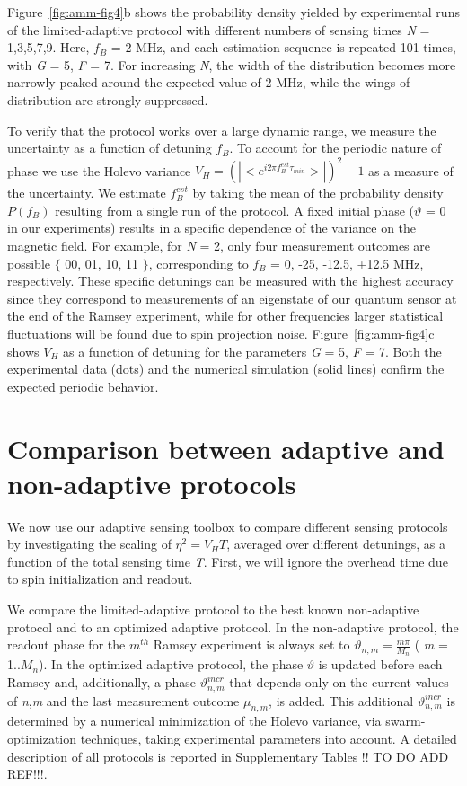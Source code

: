 Figure \,\ref{fig:amm-fig4}b shows the probability density yielded by experimental runs of the limited-adaptive protocol with different numbers of sensing times \textit{N} = 1,3,5,7,9. Here,  $f_B$ = 2 MHz, and each estimation sequence is repeated 101 times, with \textit{G} = 5, \textit{F} = 7. For increasing \textit{N}, the width of the distribution becomes more narrowly peaked around the expected value of 2 MHz, while the wings of distribution are strongly suppressed. 

To verify that the protocol works over a large dynamic range, we measure the uncertainty as a function of detuning $f_B$. To account for the periodic nature of phase we use the Holevo variance $V_H = (|<e^{i2 \pi f_B^{est} \tau_{min}}>|)^2 - 1$ as a measure of the uncertainty. We estimate  $f_B^{est}$ by taking the mean of the probability density $P(f_B)$ resulting from a single run of the protocol. A fixed initial phase ($\vartheta$ = 0 in our experiments) results in a specific dependence of the variance on the magnetic field. For example, for \textit{N} = 2, only four measurement outcomes are possible $\{$ 00, 01, 10, 11 $\}$, corresponding to $f_B$ = 0, -25, -12.5, +12.5 MHz, respectively. These specific detunings can be measured with the highest accuracy since they correspond to measurements of an eigenstate of our quantum sensor at the end of the Ramsey experiment, while for other frequencies larger statistical fluctuations will be found due to spin projection noise. Figure \,\ref{fig:amm-fig4}c shows $V_H$ as a function of detuning for the parameters \textit{G} = 5, \textit{F} = 7. Both the experimental data (dots) and the numerical simulation (solid lines) confirm the expected periodic behavior.

\section{Comparison between adaptive and non-adaptive protocols}
We now use our adaptive sensing toolbox to compare different sensing protocols by investigating the scaling of $\eta^2 = V_H T$, averaged over different detunings, as a function of the total sensing time \textit{T}. First, we will ignore the overhead time due to spin initialization and readout. 

We compare the limited-adaptive protocol to the best known non-adaptive protocol and to an optimized adaptive protocol. In the non-adaptive protocol\cite{Said_Phys.Rev.B_2011,Waldherr_NatNano_2012,Nusran_NatNano_2012}, the readout phase for the $m^{th}$ Ramsey experiment is always set to $\vartheta_{n,m} = \frac{m\pi}{M_n}$  ( \textit{m} = 1..$M_n$). In the optimized adaptive protocol\cite{Hentschel_Phys.Rev.Lett._2010,Hayes_Phys.Rev.A_2014}, the phase $\vartheta$ is updated before each Ramsey and, additionally, a phase $\vartheta_{n,m}^{incr}$ that depends only on the current values of \textit{n},\textit{m} and the last measurement outcome $\mu_{n,m}$, is added. This additional $\vartheta_{n,m}^{incr}$ is determined by a numerical minimization of the Holevo variance, via swarm-optimization techniques, taking experimental parameters into account. A detailed description of all protocols is reported in Supplementary Tables !! TO DO ADD REF!!!.


